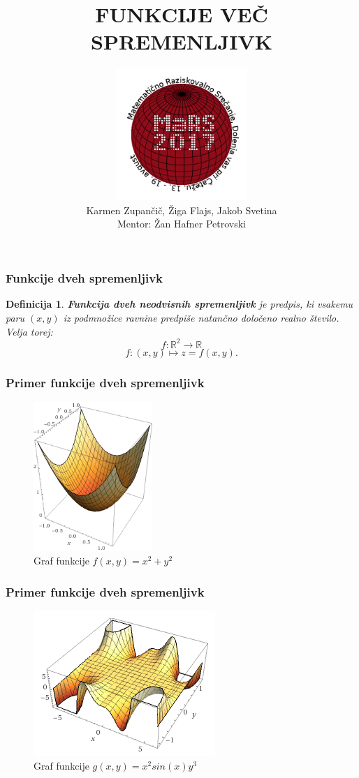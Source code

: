\documentclass{beamer}
\title{FUNKCIJE VEČ SPREMENLJIVK}
\author[Karmen, Žiga, Jakob, Žan]{\includegraphics[width = 5cm]{logo_MaRS2017.png} \\ Karmen Zupančič, Žiga Flajs, Jakob Svetina \\ Mentor: Žan Hafner Petrovski}
\theoremstyle{plain}
\newtheorem{definicija}{Definicija}
\begin{document}


\begin{frame}

\end{frame}

\begin{frame}
\frametitle{Funkcije dveh spremenljivk}


\begin{definicija}
\textbf{Funkcija dveh neodvisnih spremenljivk} je predpis, ki vsakemu paru $(x,y)$ iz podmnožice ravnine predpiše natančno določeno realno število.
Velja torej: 
$$f : \mathbb{R}^2 \rightarrow \mathbb{R}$$
$$f:(x,y) \mapsto z=f(x,y).$$

\end{definicija}
\end{frame}


\begin{frame}
\frametitle{Primer funkcije dveh spremenljivk}
\begin{figure}[h!]
\centering
\includegraphics[width=0.4\textwidth]{slika_funkcije.PNG}
\caption{Graf funkcije $f(x,y)=x^2+y^2$}
\end{figure}
\end{frame}

\begin{frame}
\frametitle{Primer funkcije dveh spremenljivk}
\begin{figure}[h!]
\centering
\includegraphics{funkcija_2.PNG}
\caption{Graf funkcije $g(x,y)=x^2 sin(x)y^3$}
\end{figure}
\end{frame}
\end{document}
